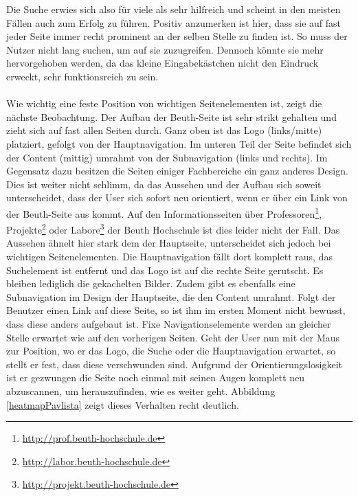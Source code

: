 Die Suche erwies sich also für viele als sehr hilfreich und scheint in den meisten Fällen auch zum Erfolg zu führen. Positiv anzumerken ist hier, dass sie auf fast jeder Seite immer recht prominent an der selben Stelle zu finden ist. So muss der Nutzer nicht lang suchen, um auf sie zuzugreifen. Dennoch könnte sie mehr hervorgehoben werden, da das kleine Eingabekästchen nicht den Eindruck erweckt, sehr funktionsreich zu sein.\\
\\
Wie wichtig eine feste Position von wichtigen Seitenelementen ist, zeigt die nächste Beobachtung. Der Aufbau der Beuth-Seite ist sehr strikt gehalten und zieht sich auf fast allen Seiten durch. Ganz oben ist das Logo (links/mitte) platziert, gefolgt von der Hauptnavigation. Im unteren Teil der Seite befindet sich der Content (mittig) umrahmt von der Subnavigation (links und rechts). Im Gegensatz dazu besitzen die Seiten einiger Fachbereiche ein ganz anderes Design. Dies ist weiter nicht schlimm, da das Aussehen und der Aufbau sich soweit unterscheidet, dass der User sich sofort neu orientiert, wenn er über ein Link von der Beuth-Seite aus kommt. Auf den Informationsseiten über Professoren\footnote{\url{http://prof.beuth-hochschule.de}}, Projekte\footnote{\url{http://labor.beuth-hochschule.de}} oder Labore\footnote{\url{http://projekt.beuth-hochschule.de}} der Beuth Hochschule ist dies leider nicht der Fall. Das Aussehen ähnelt hier stark dem der Hauptseite, unterscheidet sich jedoch bei wichtigen Seitenelementen. Die Hauptnavigation fällt dort komplett raus, das Suchelement ist entfernt und das Logo ist auf die rechte Seite gerutscht. Es bleiben lediglich die gekachelten Bilder. Zudem gibt es ebenfalls eine Subnavigation im Design der Hauptseite, die den Content umrahmt. Folgt der Benutzer einen Link auf diese Seite, so ist ihm im ersten Moment nicht bewusst, dass diese anders aufgebaut ist. Fixe Navigationselemente werden an gleicher Stelle erwartet wie auf den vorherigen Seiten. Geht der User nun mit der Maus zur Position, wo er das Logo, die Suche oder die Hauptnavigation erwartet, so stellt er fest, dass diese verschwunden sind. Aufgrund der Orientierungslosigkeit ist er gezwungen die Seite noch einmal mit seinen Augen komplett neu abzuscannen, um herauszufinden, wie es weiter geht. Abbildung \ref{heatmapPavlista} zeigt dieses Verhalten recht deutlich.

